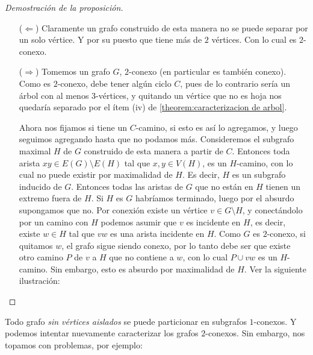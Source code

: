 \documentclass[12pt]{report}
\theoremstyle{plain}
\theoremstyle{definition}
\begin{document}
\begin{proof}[Demostración de la proposición]
\begin{enumerate}
\item[]

\item[($\Leftarrow$)] Claramente un grafo construido de esta manera no se puede separar por un solo vértice. Y por su puesto que tiene más de $2$ vértices. Con lo cual es $2$-conexo.

\item[($\Rightarrow$)] Tomemos un grafo $G$, $2$-conexo (en particular es también conexo). Como es $2$-conexo, debe tener algún ciclo $C$, pues de lo contrario sería un árbol con al menos $3$-vértices, y quitando un vértice que no es hoja nos quedaría separado por el ítem (iv) de \ref{theorem:caracterizacion de arbol}.

Ahora nos fijamos si tiene un $C$-camino, si esto es así lo agregamos, y luego seguimos agregando hasta que no podamos más. Consideremos el subgrafo maximal $H$ de $G$ construido de esta manera a partir de $C$. Entonces toda arista $xy \in E(G) \setminus E(H)$ tal que $x,y \in V(H)$, es un $H$-camino, con lo cual no puede existir por maximalidad de $H$. Es decir, $H$ es un subgrafo inducido de $G$. Entonces todas las aristas de $G$ que no están en $H$ tienen un extremo fuera de $H$. Si $H$ es $G$ habríamos terminado, luego por el absurdo supongamos que no. Por conexión existe un vértice $v \in G \setminus H$, y conectándolo por un camino con $H$ podemos asumir que $v$ es incidente en $H$, es decir, existe $w \in H$ tal que $v w$ es una arista incidente en $H$. Como $G$ es $2$-conexo, si quitamos $w$, el grafo sigue siendo conexo, por lo tanto debe ser que existe otro camino $P$ de $v$ a $H$ que no contiene a $w$, con lo cual $P \cup v w$ es un $H$-camino. Sin embargo, esto es absurdo por maximalidad de $H$. Ver la siguiente ilustración:

\end{enumerate}
\end{proof}














Todo grafo \textit{sin vértices aislados} se puede particionar en subgrafos $1$-conexos. Y podemos intentar nuevamente caracterizar los grafos $2$-conexos. Sin embargo, nos topamos con problemas, por ejemplo:
\end{document}
